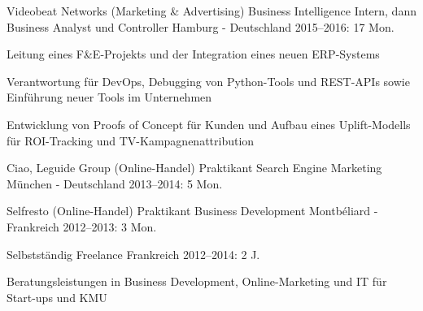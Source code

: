 \begin{cventries}
  \cventry
    {Videobeat Networks (Marketing \& Advertising)} %
    {Business Intelligence Intern, dann Business Analyst und Controller} %
    {Hamburg - Deutschland} %
    {2015--2016: 17 Mon.} %
    {
      \begin{cvitems} %
        \item {Leitung eines F\&E-Projekts und der Integration eines neuen ERP-Systems}
        \item {Verantwortung für DevOps, Debugging von Python-Tools und REST-APIs sowie Einführung neuer Tools im Unternehmen}
        \item {Entwicklung von Proofs of Concept für Kunden und Aufbau eines Uplift-Modells für ROI-Tracking und TV-Kampagnenattribution}
      \end{cvitems}
    }

  \cventryshort
    {Ciao, Leguide Group (Online-Handel)} %
    {Praktikant Search Engine Marketing} %
    {München - Deutschland} %
    {2013--2014: 5 Mon.} %

  \cventryshort
    {Selfresto (Online-Handel)} %
    {Praktikant Business Development} %
    {Montbéliard - Frankreich} %
    {2012--2013: 3 Mon.} %

  \cventry
    {Selbstständig} %
    {Freelance} %
    {Frankreich} %
    {2012--2014: 2 J.} %
    {
      \begin{cvitems} %
        \item {Beratungsleistungen in Business Development, Online-Marketing und IT für Start-ups und KMU}
      \end{cvitems}
    }

\end{cventries}
